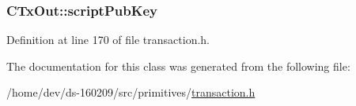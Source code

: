 \subsubsection[{script\+Pub\+Key}]{ C\+Tx\+Out\+::script\+Pub\+Key}\label{class_c_tx_out_a25bf3f2f4befb22a6a0be45784fe57e2}


Definition at line 170 of file transaction.\+h.



The documentation for this class was generated from the following file\+:\begin{DoxyCompactItemize}
\item 
/home/dev/ds-\/160209/src/primitives/\hyperlink{transaction_8h}{transaction.\+h}\end{DoxyCompactItemize}
